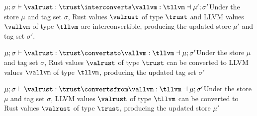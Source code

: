 \begin{infersection}{$\mu;\sigma \vdash \valrust:\trust \interconverts \vallvm:\tllvm \dashv \mu';\sigma'$}{Under the store $\mu$ and tag set $\sigma$, Rust values $\valrust$ of type $\trust$ and LLVM values $\vallvm$ of type $\tllvm$ are interconvertible, producing the updated store $\mu'$ and tag set $\sigma'$.}

\end{infersection}

\begin{infersection}{$\mu;\sigma \vdash \valrust:\trust  \convertsto \vallvm:\tllvm \dashv \mu;\sigma'$}{Under the store $\mu$ and tag set $\sigma$, Rust values $\valrust$ of type $\trust$ can be converted to LLVM values $\vallvm$ of type $\tllvm$, producing the updated tag set $\sigma'$}

\end{infersection}

\begin{infersection}{$\mu;\sigma \vdash \valrust:\trust \convertsfrom \vallvm:\tllvm \dashv \mu;\sigma'$}{Under the store $\mu$ and tag set $\sigma$, LLVM values $\valrust$ of type $\tllvm$ can be converted to Rust values $\valrust$ of type $\trust$, producing the updated store $\mu'$}

\end{infersection}